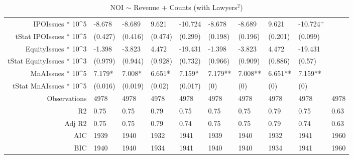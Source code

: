 \begin{table}[ht]
\begin{tabular}{rlllllllll}
  IPOIssues * 10^5 & -8.678 & -8.689 & 9.621 & -10.724 & -8.678 & -8.689 & 9.621 & -10.724$^{+}$ &  \\ 
  tStat IPOIssues * 10^5 & (0.427) & (0.416) & (0.474) & (0.299) & (0.198) & (0.196) & (0.201) & (0.099) &  \\ 
  EquityIssues * 10^3 & -1.398 & -3.823 & 4.472 & -19.431 & -1.398 & -3.823 & 4.472 & -19.431 &  \\ 
  tStat EquityIssues * 10^3 & (0.979) & (0.944) & (0.928) & (0.732) & (0.966) & (0.909) & (0.886) & (0.57) &  \\ 
  MnAIssues * 10^5 & 7.179* & 7.008* & 6.651* & 7.159* & 7.179** & 7.008** & 6.651** & 7.159** &  \\ 
  tStat MnAIssues * 10^5 & (0.016) & (0.019) & (0.02) & (0.017) & (0) & (0) & (0) & (0) &  \\ 
  Observations & 4978 & 4978 & 4978 & 4978 & 4978 & 4978 & 4978 & 4978 & 4978 \\ 
  R2 & 0.75 & 0.75 & 0.79 & 0.75 & 0.75 & 0.75 & 0.79 & 0.75 & 0.63 \\ 
  Adj R2 & 0.75 & 0.75 & 0.79 & 0.74 & 0.75 & 0.75 & 0.79 & 0.74 & 0.63 \\ 
  AIC & 1939 & 1940 & 1932 & 1941 & 1939 & 1940 & 1932 & 1941 & 1960 \\ 
  BIC & 1940 & 1940 & 1934 & 1941 & 1940 & 1940 & 1934 & 1941 & 1960 \\ 
   \hline
\end{tabular}
\caption{NOI $\sim$ Revenue + Counts (with Lawyers$^2$)} 
\end{table}
